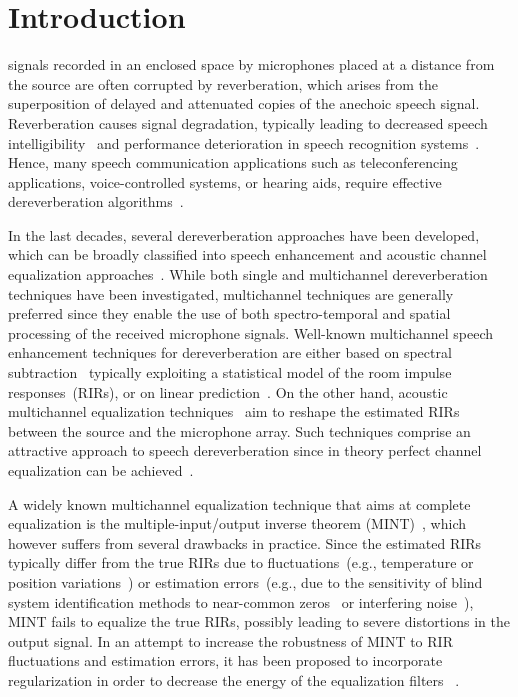\documentclass[draftcls,onecolumn,11pt]{IEEEtran}
\begin{document}
\section{Introduction}
 signals recorded in an enclosed space by microphones placed at a distance from the source are often corrupted by reverberation, which arises from the superposition of delayed and attenuated copies of the anechoic speech signal.
Reverberation causes signal degradation, typically leading to decreased speech intelligibility~\cite{Houtgast_1985,Beutelmann_2006} and performance deterioration in speech recognition systems~\cite{Omologo_1998, Sehr_phd, Maas_ICASSP_2012}.
Hence, many speech communication applications such as teleconferencing applications, voice-controlled systems, or hearing aids, require effective dereverberation algorithms~\cite{Sehr_phd,Jeub_ITASP_2010,Maas_ICASSP_2012}.

In the last decades, several dereverberation approaches have been developed, which can be broadly classified into speech enhancement and acoustic channel equalization approaches~\cite{Naylor_Derev_book}.
While both single and multichannel dereverberation techniques have been investigated, multichannel techniques are generally preferred since they enable the use of both spectro-temporal and spatial processing of the received microphone signals.
Well-known multichannel speech enhancement techniques for dereverberation are either based on spectral subtraction~\cite{Habets_ITASLP_2008,Habets_ICASSP_2007} typically exploiting a statistical model of the room impulse responses~(RIRs), or on linear prediction~\cite{Gaubitch_JASA_2006,Delcroix_2007,Nakatani_ITASLP_2010}.
On the other hand, acoustic multichannel equalization techniques~\cite{Miyoshi_ITASS_1988,Kallinger_ICASSP_2006, Hikichi_EURASIP_2007, Mertins_ITASLP_2010, Zhang_IWAENC_2010, Haque_ITASLP_2011, Kodrasi_ICASSP_2012} aim to reshape the estimated RIRs between the source and the microphone array.
Such techniques comprise an attractive approach to speech dereverberation since in theory perfect channel equalization can be achieved~\cite{Miyoshi_ITASS_1988, Hacihabibouglu_ITASLP_2012}.

A widely known multichannel equalization technique that aims at complete equalization is the multiple-input/output inverse theorem (MINT)~\cite{Miyoshi_ITASS_1988}, which however suffers from several drawbacks in practice.
Since the estimated RIRs typically differ from the true RIRs due to fluctuations~(e.g., temperature or position variations~\cite{Radlovic_ITSA_2000}) or estimation errors~(e.g., due to the sensitivity of blind system identification methods to near-common zeros~\cite{Lin_ITASLP_2012} or interfering noise~\cite{Hasan_EUSIPCO_2006}), MINT fails to equalize the true RIRs, possibly leading to severe distortions in the output signal.
In an attempt to increase the robustness of MINT to RIR fluctuations and estimation errors, it has been proposed to incorporate regularization in order to decrease the energy of the equalization filters~\cite{Hikichi_EURASIP_2007} .
\end{document}
